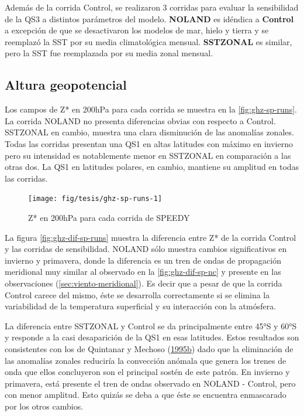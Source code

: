 \documentclass[spanish,a4paper,12pt,oneside]{book}
\begin{document}
Además de la corrida Control, se realizaron 3 corridas para evaluar la
sensibilidad de la QS3 a distintos parámetros del modelo.
\textbf{NOLAND} es idéndica a \textbf{Control} a excepción de que se
desactivaron los modelos de mar, hielo y tierra y se reemplazó la SST
por su media climatológica mensual. \textbf{SSTZONAL} es similar, pero
la SST fue reemplazada por su media zonal mensual.

\subsection{Altura geopotencial}\label{altura-geopotencial-2}

Los campos de Z* en 200hPa para cada corrida se muestra en la
\autoref{fig:ghz-sp-runs}. La corrida NOLAND no presenta diferencias
obvias con respecto a Control. SSTZONAL en cambio, muestra una clara
disminución de las anomalías zonales. Todas las corridas presentan una
QS1 en altas latitudes con máximo en invierno pero su intensidad es
notablemente menor en SSTZONAL en comparación a las otras dos. La QS1 en
latitudes polares, en cambio, mantiene su amplitud en todas las
corridas.

\begin{landscape}\begin{figure}

{\centering \texttt{[image: fig/tesis/ghz-sp-runs-1]} 

}

\caption{Z* en 200hPa para cada corrida de SPEEDY}\label{fig:ghz-sp-runs}
\end{figure}
\end{landscape}

La figura \autoref{fig:ghz-dif-sp-runs} muestra la diferencia entre Z*
de la corrida Control y las corridas de sensibilidad. NOLAND sólo
muestra cambios significativos en invierno y primavera, donde la
diferencia es un tren de ondas de propagación meridional muy similar al
observado en la \autoref{fig:ghz-dif-sp-nc} y presente en las
observaciones (\autoref{sec:viento-meridional}). Es decir que a pesar de
que la corrida Control carece del mismo, éste se desarrolla
correctamente si se elimina la variabilidad de la temperatura
superficial y su interacción con la atmósfera.

La diferencia entre SSTZONAL y Control se da principalmente entre 45°S y
60°S y responde a la casi desaparición de la QS1 en esas latitudes.
Estos resultados son consistentes con los de Quintanar y Mechoso
(\protect\hyperlink{ref-Quintanar1995}{1995}\protect\hyperlink{ref-Quintanar1995}{b})
dado que la eliminación de las anomalías zonales reduciría la convección
anómala que genera los trenes de onda que ellos concluyeron son el
principal sostén de este patrón. En invierno y primavera, está presente
el tren de ondas observado en NOLAND - Control, pero con menor amplitud.
Esto quizás se deba a que éste se encuentra enmascarado por los otros
cambios.
\end{document}
